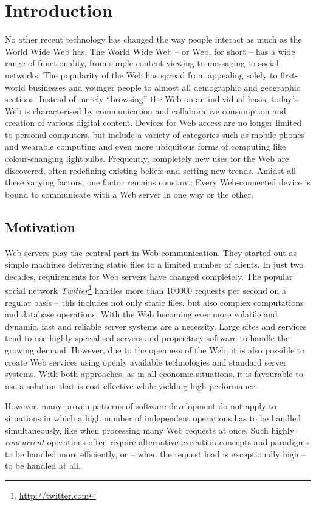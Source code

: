 \chapter{Introduction}
No other recent technology has changed the way people interact as much as the World Wide Web has. The World Wide Web -- or Web, for short -- has a wide range of functionality, from simple content viewing to messaging to social networks. The popularity of the Web has spread from appealing solely to first-world businesses and younger people to almost all demographic and geographic sections. Instead of merely ``browsing'' the Web on an individual basis, today's Web is characterised by communication and collaborative consumption and creation of various digital content. Devices for Web access are no longer limited to personal computers, but include a variety of categories such as mobile phones and wearable computing and even more ubiquitous forms of computing like colour-changing lightbulbs. Frequently, completely new uses for the Web are discovered, often redefining existing beliefs and setting new trends. Amidst all these varying factors, one factor remains constant: Every Web-connected device is bound to communicate with a Web server in one way or the other.

\section{Motivation}
Web servers play the central part in Web communication. They started out as simple machines delivering static files to a limited number of clients. In just two decades, requirements for Web servers have changed completely. The popular social network \textit{Twitter}\footnote{\url{http://twitter.com}} handles more than 100000 requests per second on a regular basis -- this includes not only static files, but also complex computations and database operations. With the Web becoming ever more volatile and dynamic, fast and reliable server systems are a necessity. Large sites and services tend to use highly specialised servers and proprietary software to handle the growing demand. However, due to the openness of the Web, it is also possible to create Web services using openly available technologies and standard server systems. With both approaches, as in all economic situations, it is favourable to use a solution that is cost-effective while yielding high performance.

However, many proven patterns of software development do not apply to situations in which a high number of independent operations has to be handled simultaneously, like when processing many Web requests at once. Such highly \textit{concurrent} operations often require alternative execution concepts and paradigms to be handled more efficiently, or -- when the request load is exceptionally high -- to be handled at all.

